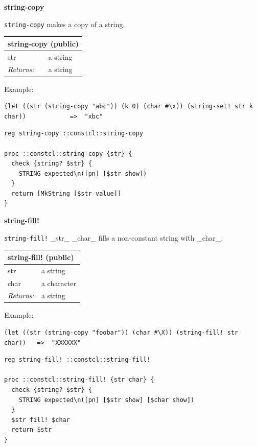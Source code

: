 \documentclass[twoside,9pt]{report}
\begin{document}
\textbf{string-copy}


\texttt{string-copy} makes a copy of a string.

\begin{tabular}{ |l l| }
\hline
\multicolumn{2}{|l|}{string-copy (public)} \\
\hline
str & a string \\
\textit{Returns:} & a string \\
\hline
\end{tabular}


Example:

\noindent\makebox[\linewidth]{\rule{\linewidth}{0.4pt}}
\begin{lstlisting}
(let ((str (string-copy "abc")) (k 0) (char #\x)) (string-set! str k char))            =>  "xbc"
\end{lstlisting}
\noindent\makebox[\linewidth]{\rule{\linewidth}{0.4pt}}
\noindent\makebox[\linewidth]{\rule{\linewidth}{0.4pt}}
\begin{lstlisting}
reg string-copy ::constcl::string-copy
 
proc ::constcl::string-copy {str} {
  check {string? $str} {
    STRING expected\n([pn] [$str show])
  }
  return [MkString [$str value]]
}
\end{lstlisting}
\noindent\makebox[\linewidth]{\rule{\linewidth}{0.4pt}}

\textbf{string-fill!}


\texttt{string-fill!} \_str\_ \_char\_ fills a non-constant string with \_char\_.

\begin{tabular}{ |l l| }
\hline
\multicolumn{2}{|l|}{string-fill! (public)} \\
\hline
str & a string \\
char & a character \\
\textit{Returns:} & a string \\
\hline
\end{tabular}


Example:

\noindent\makebox[\linewidth]{\rule{\linewidth}{0.4pt}}
\begin{lstlisting}
(let ((str (string-copy "foobar")) (char #\X)) (string-fill! str char))   =>  "XXXXXX"
\end{lstlisting}
\noindent\makebox[\linewidth]{\rule{\linewidth}{0.4pt}}
\noindent\makebox[\linewidth]{\rule{\linewidth}{0.4pt}}
\begin{lstlisting}
reg string-fill! ::constcl::string-fill!
 
proc ::constcl::string-fill! {str char} {
  check {string? $str} {
    STRING expected\n([pn] [$str show] [$char show])
  }
  $str fill! $char
  return $str
}
\end{lstlisting}
\noindent\makebox[\linewidth]{\rule{\linewidth}{0.4pt}}
\end{document}
